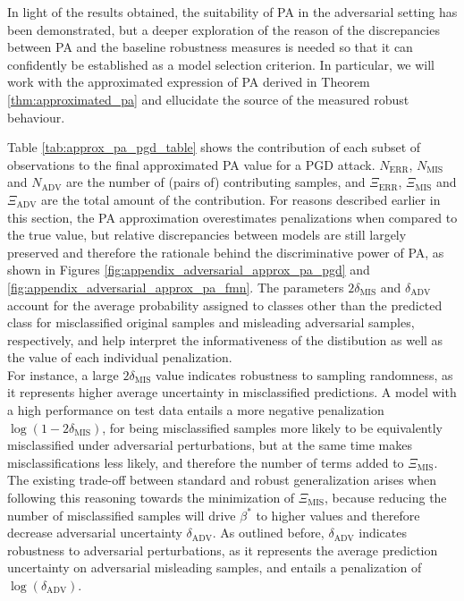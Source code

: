 In light of the results obtained, the suitability of
PA in the adversarial setting has been demonstrated, but a deeper exploration of the
reason of the discrepancies between PA and the baseline robustness measures is needed
so that it can confidently be established as a model selection criterion. In particular,
we will work with the approximated expression of PA derived in Theorem \ref{thm:approximated_pa} 
and ellucidate the source of the measured robust behaviour.

Table \ref{tab:approx_pa_pgd_table} shows the contribution of each subset of observations to the final
approximated PA value for a PGD attack. $N_{\text{ERR}}$, $N_{\text{MIS}}$ and $N_{\text{ADV}}$ are the number of (pairs of)
contributing samples, and $\Xi_{\text{ERR}}$, $\Xi_{\text{MIS}}$ and $\Xi_{\text{ADV}}$ are
the total amount of the contribution. For reasons described earlier in this section,
the PA approximation overestimates penalizations when compared to the true value, but
relative discrepancies between models are still largely preserved and therefore the rationale
behind the discriminative power of PA, as shown in Figures \ref{fig:appendix_adversarial_approx_pa_pgd}
and \ref{fig:appendix_adversarial_approx_pa_fmn}. The parameters $2 \delta_{\text{MIS}}$ and
$\delta_{\text{ADV}}$ account for the average probability assigned to classes other than the predicted
class for misclassified original samples and misleading adversarial samples, respectively, and 
help interpret the informativeness of the distibution as well as the value of each individual 
penalization. \\

For instance, a large $2 \delta_{\text{MIS}}$ value indicates robustness to sampling randomness, as it
represents higher average uncertainty in misclassified predictions. A model with a high performance on 
test data entails a more negative penalization $\log(1 - 2 \delta_{\text{MIS}})$, for being misclassified 
samples more likely to be equivalently misclassified under adversarial perturbations, but at
the same time makes misclassifications less likely, and therefore the number of terms added to
$\Xi_{\text{MIS}}$. The existing trade-off between standard and robust generalization arises when 
following this reasoning towards the minimization of $\Xi_{\text{MIS}}$, because reducing the number of 
misclassified samples will drive $\beta^{*}$ to higher values and therefore decrease adversarial 
uncertainty $\delta_{\text{ADV}}$. As outlined before, $\delta_{\text{ADV}}$ indicates 
robustness to adversarial perturbations, as it represents the average prediction uncertainty on adversarial 
misleading samples, and entails a penalization of $\log(\delta_{\text{ADV}})$. \\

